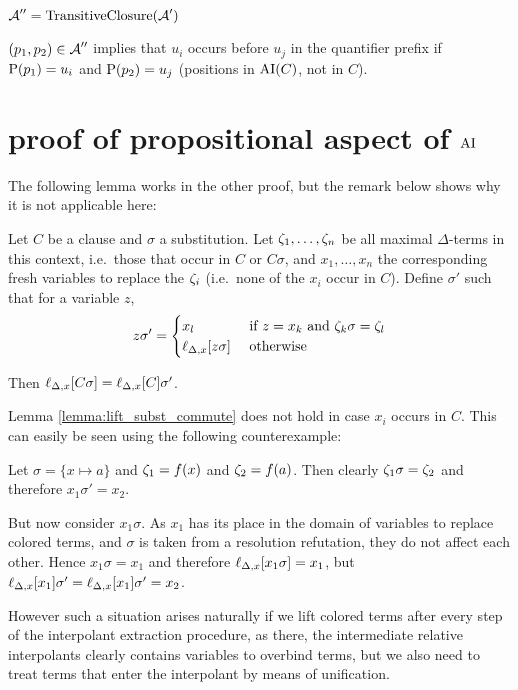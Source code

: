 \documentclass[,%
	paper=a4,%
	DIV10, %
	twoside=false,%
	liststotoc,
	bibtotoc,
	draft=false,%
	numbers=noendperiod
]{scrartcl}
\begin{document}

$\operatorname{\mathcal{A}}'' = \operatorname{TransitiveClosure}(\operatorname{\mathcal{A}}')$

$(p_1, p_2) \in \operatorname{\mathcal{A}}'' $ implies
that $u_i$ occurs before $u_j$ in the quantifier prefix if $\operatorname{{\operatorname P}}(p_1) = u_i$ and $\operatorname{{\operatorname P}}(p_2) = u_j$ (positions in $\operatorname{AI}(C)$, not in $C$).


\clearpage

\section{proof of propositional aspect of $\operatorname{AI}$}

The following lemma works in the other proof, but the remark below shows why it is not applicable here:

\begin{lemma} 
	\label{lemma:lift_subst_commute}
	Let $C$ be a clause and $\sigma$ a substitution.
	Let $\zeta_{1},\ldots,\zeta_{n}$ be all maximal $\Delta$-terms in this context, i.e.\ those that occur in $C$ or $C\sigma$,  and
	$x_1, \ldots, x_n$ the corresponding fresh variables to replace the $\zeta_{i}$ (i.e.~none of the $x_i$ occur in $C$).
	Define $\sigma'$ such that for a variable $z$,
	\[
		z \sigma' =
		\begin{cases} 
			x_l & \text{ if } z = x_k \text{ and } \zeta_{k}\sigma = \zeta_{l}  \\
			\ell_{\Delta,x}[z\sigma] & \text{ otherwise}
		\end{cases} 
	\]

	Then
	$\ell_{\Delta,x}[C\sigma] =
	\ell_{\Delta,x}[C]\sigma'$.
\end{lemma}

\begin{remark}
	Lemma \ref{lemma:lift_subst_commute} does not hold in case $x_i$ occurs in $C$.
	This can easily be seen using the following counterexample:


	Let $\sigma = \{x \mapsto a\}$ and $\zeta_{1} = f(x)$ and $\zeta_{2} = f(a)$. 
	Then clearly $\zeta_{1}\sigma = \zeta_{2}$ and therefore $x_1\sigma' = x_2$.

	But now consider $x_1 \sigma$. 
	As $x_1$ has its place in the domain of variables to replace colored terms, and $\sigma$ is taken from a resolution refutation, they do not affect each other. 
	Hence $x_1\sigma = x_1$ and therefore $\ell_{\Delta,x}[x_1\sigma] = x_1$, but $\ell_{\Delta,x}[x_1]\sigma' = \ell_{\Delta,x}[x_1]\sigma' = x_2$.


	However such a situation arises naturally if we lift colored terms after every step of the interpolant extraction procedure, as there, the intermediate relative interpolants clearly contains variables to overbind terms, but we also need to treat terms that enter the interpolant by means of unification.
\end{remark}
\end{document}
